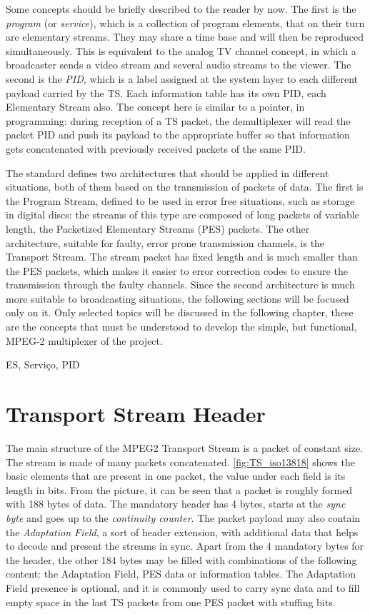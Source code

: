 \documentclass[
	12pt,				%
	openright,			%
	twoside,			%
	a4paper,			%
	brazil,
	french,				%
	english
	]{abntex2}
\begin{document}
Some concepts should be briefly described to the reader by now. The first is the \textit{program} (or \textit{service}), which is a collection of program elements, that on their turn are elementary streams. They may share a time base and will then be reproduced simultaneously. This is equivalent to the analog TV channel concept, in which a broadcaster sends a video stream and several audio streams to the viewer. The second is the \textit{PID}, which is a label assigned at the system layer to each different payload carried by the TS. Each information table has its own PID, each Elementary Stream also. The concept here is similar to a pointer, in programming: during reception of a TS packet, the demultiplexer will read the packet PID and push its payload to the appropriate buffer so that information gets concatenated with previously received packets of the same PID.

The standard defines two architectures that should be applied in different situations, both of them based on the transmission of packets of data. The first is the Program Stream, defined to be used in error free situations, such as storage in digital discs: the streams of this type are composed of long packets of variable length, the Packetized Elementary Streams (PES) packets. The other architecture, suitable for faulty, error prone transmission channels, is the Transport Stream. The stream packet has fixed length and is much smaller than the PES packets, which makes it easier to error correction codes to ensure the transmission through the faulty channels. Since the second architecture is much more suitable to broadcasting situations, the following sections will be focused only on it. Only selected topics will be discussed in the following chapter, these are the concepts that must be understood to develop the simple, but functional, MPEG-2 multiplexer of the project.

ES, Serviço, PID

\section{Transport Stream Header}
The main structure of the MPEG2 Transport Stream is a packet of constant size. The stream is made of many packets concatenated. \autoref{fig:TS_iso13818} shows the basic elements that are present in one packet, the value under each field is its length in bits. From the picture, it can be seen that a packet is roughly formed with 188 bytes of data. The mandatory header has 4 bytes, starts at the \textit{sync byte} and goes up to the \textit{continuity counter}. The packet payload may also contain the \textit{Adaptation Field}, a sort of header extension, with additional data that helps to decode and present the streams in sync. Apart from the 4 mandatory bytes for the header, the other 184 bytes may be filled with combinations of the following content: the Adaptation Field, PES data or information tables. The Adaptation Field presence is optional, and it is commonly used to carry sync data and to fill empty space in the last TS packets from one PES packet with stuffing bits.
\end{document}
